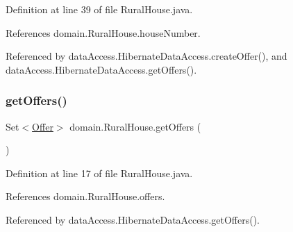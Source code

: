 Definition at line 39 of file Rural\+House.\+java.


\begin{DoxyCode}{0}

\end{DoxyCode}


References domain.\+Rural\+House.\+house\+Number.



Referenced by data\+Access.\+Hibernate\+Data\+Access.\+create\+Offer(), and data\+Access.\+Hibernate\+Data\+Access.\+get\+Offers().

\mbox{\label{classdomain_1_1RuralHouse_ab80c8a3e186714dfb11557b626ecfb1c}} 
\subsubsection{\texorpdfstring{getOffers()}{getOffers()}\hspace{0.1cm}{\footnotesize\ttfamily [1/2]}}
{\footnotesize\ttfamily Set$<$\mbox{\hyperlink{classdomain_1_1Offer}{Offer}}$>$ domain.\+Rural\+House.\+get\+Offers (\begin{DoxyParamCaption}{ }\end{DoxyParamCaption})}



Definition at line 17 of file Rural\+House.\+java.


\begin{DoxyCode}{0}

\end{DoxyCode}


References domain.\+Rural\+House.\+offers.



Referenced by data\+Access.\+Hibernate\+Data\+Access.\+get\+Offers().

\mbox{\label{classdomain_1_1RuralHouse_abe770c8a0fbcfed83a358d84bacd66f7}} 
